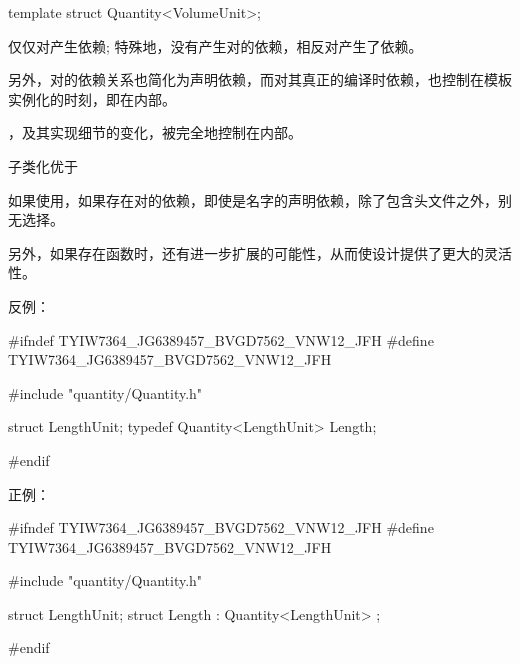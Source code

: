 \begin{content}
\begin{leftbar}
\begin{c++}[caption={quantity/Volume.cpp}]
template struct Quantity<VolumeUnit>;
\end{c++}
\end{leftbar}

仅仅对产生依赖; 特殊地，没有产生对的依赖，相反对产生了依赖。

另外，对的依赖关系也简化为声明依赖，而对其真正的编译时依赖，也控制在模板实例化的时刻，即在内部。

，及其实现细节的变化，被完全地控制在内部。

\begin{advise}
子类化优于
\end{advise}

如果使用，如果存在对的依赖，即使是名字的声明依赖，除了包含头文件之外，别无选择。

另外，如果存在函数时，还有进一步扩展的可能性，从而使设计提供了更大的灵活性。

反例：
\begin{leftbar}
\begin{c++}[caption={quantity/Length.h}]
#ifndef TYIW7364_JG6389457_BVGD7562_VNW12_JFH
#define TYIW7364_JG6389457_BVGD7562_VNW12_JFH

#include "quantity/Quantity.h"

struct LengthUnit;
typedef Quantity<LengthUnit> Length;

#endif
\end{c++}
\end{leftbar}

正例：
\begin{leftbar}
\begin{c++}[caption={quantity/Length.h}]
#ifndef TYIW7364_JG6389457_BVGD7562_VNW12_JFH
#define TYIW7364_JG6389457_BVGD7562_VNW12_JFH

#include "quantity/Quantity.h"

struct LengthUnit;
struct Length : Quantity<LengthUnit> {};

#endif
\end{c++}
\end{leftbar}

\end{content}
